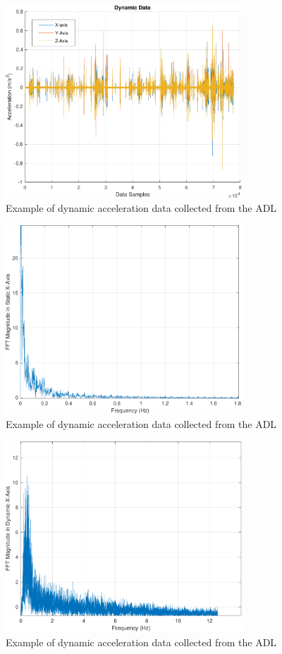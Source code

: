 \documentclass[conference]{IEEEtran}
\begin{document}
\begin{figure}[h]
	\centering
	\includegraphics[width=3.49in]{2_dynamic.pdf}
	\caption{Example of dynamic acceleration data collected from the ADL}
	\label{dynamic}
\end{figure}

\begin{figure}[h]
	\centering
	\includegraphics[width=3.49in]{3_feed_static_fft.pdf}
	\caption{Example of dynamic acceleration data collected from the ADL}
	\label{dynamic}
\end{figure}

\begin{figure}[h]
	\centering
	\includegraphics[width=3.49in]{4_feed_dynamic_fft.pdf}
	\caption{Example of dynamic acceleration data collected from the ADL}
	\label{dynamic}
\end{figure}
\end{document}
